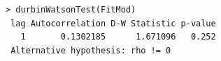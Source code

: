 \documentclass[residuals.tex]{subfiles}
\begin{document}
\begin{framed}
\begin{verbatim}
> durbinWatsonTest(FitMod)
 lag Autocorrelation D-W Statistic p-value
   1       0.1302185      1.671096   0.252
 Alternative hypothesis: rho != 0
\end{verbatim}
\end{framed}

\end{document}
